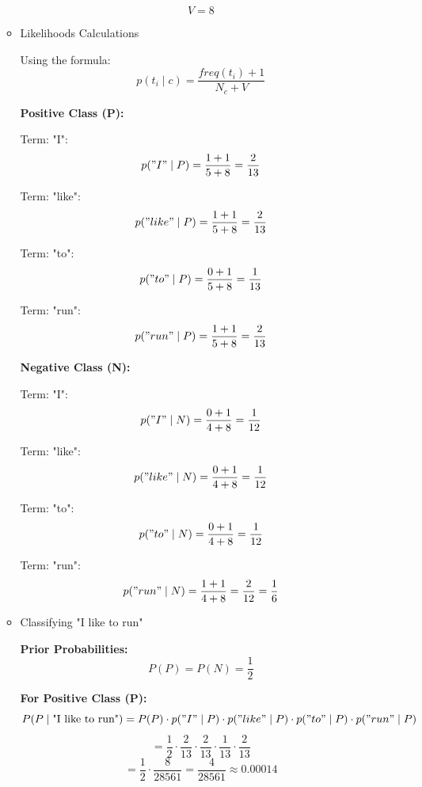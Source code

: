 \documentclass[12pt]{article}
\begin{document}
\begin{enumerate}[leftmargin=\labelsep, label=\textbf{\arabic*.)}]
\begin{itemize}
                    \[
                        V = 8
                    \]

              \item Likelihoods Calculations

                    Using the formula:
                    \[
                        p(t_i \mid c) = \frac{freq(t_i) + 1}{N_c + V}
                    \]

                    \textbf{Positive Class (P):}

                    Term: "I":
                    \[
                        p("I" \mid P) = \frac{1 + 1}{5 + 8} = \frac{2}{13}
                    \]

                    Term: "like":
                    \[
                        p("like" \mid P) = \frac{1 + 1}{5 + 8} = \frac{2}{13}
                    \]

                    Term: "to":
                    \[
                        p("to" \mid P) = \frac{0 + 1}{5 + 8} = \frac{1}{13}
                    \]

                    Term: "run":
                    \[
                        p("run" \mid P) = \frac{1 + 1}{5 + 8} = \frac{2}{13}
                    \]

                    \textbf{Negative Class (N):}

                    Term: "I":
                    \[
                        p("I" \mid N) = \frac{0 + 1}{4 + 8} = \frac{1}{12}
                    \]

                    Term: "like":
                    \[
                        p("like" \mid N) = \frac{0 + 1}{4 + 8} = \frac{1}{12}
                    \]

                    Term: "to":
                    \[
                        p("to" \mid N) = \frac{0 + 1}{4 + 8} = \frac{1}{12}
                    \]

                    Term: "run":
                    \[
                        p("run" \mid N) = \frac{1 + 1}{4 + 8} = \frac{2}{12} = \frac{1}{6}
                    \]

              \item Classifying "I like to run"

                    \textbf{Prior Probabilities:}
                    \[
                        P(P) = P(N) = \frac{1}{2}
                    \]

                    \textbf{For Positive Class (P):}
                    \[
                        P(P \mid \text{"I  like to run"}) = P(P) \cdot p("I" \mid P) \cdot p("like" \mid P) \cdot p("to" \mid P) \cdot p("run" \mid P)
                    \]
                    \[
                        = \frac{1}{2} \cdot \frac{2}{13} \cdot \frac{2}{13} \cdot \frac{1}{13} \cdot \frac{2}{13}
                    \]
                    \[
                        = \frac{1}{2} \cdot \frac{8}{28561} = \frac{4}{28561} \approx 0.00014
                    \]


\end{itemize}
\end{enumerate}
\end{document}
